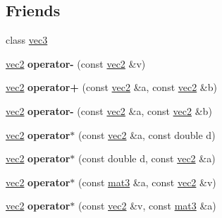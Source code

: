 \subsection*{Friends}
\begin{DoxyCompactItemize}
\item 
\hypertarget{classvec2_aa849243c6cd858bbcd88237a8ad16cad}{
class \hyperlink{classvec2_aa849243c6cd858bbcd88237a8ad16cad}{vec3}}
\label{classvec2_aa849243c6cd858bbcd88237a8ad16cad}

\item 
\hypertarget{classvec2_a4a372204e9d4fbce7b21ba855dc5e567}{
\hyperlink{classvec2}{vec2} {\bfseries operator-\/} (const \hyperlink{classvec2}{vec2} \&v)}
\label{classvec2_a4a372204e9d4fbce7b21ba855dc5e567}

\item 
\hypertarget{classvec2_af88e7bfe4941c172e739b2ed12dc3dbf}{
\hyperlink{classvec2}{vec2} {\bfseries operator+} (const \hyperlink{classvec2}{vec2} \&a, const \hyperlink{classvec2}{vec2} \&b)}
\label{classvec2_af88e7bfe4941c172e739b2ed12dc3dbf}

\item 
\hypertarget{classvec2_a38bfd1f3fcf7ccb830294f81494c31f5}{
\hyperlink{classvec2}{vec2} {\bfseries operator-\/} (const \hyperlink{classvec2}{vec2} \&a, const \hyperlink{classvec2}{vec2} \&b)}
\label{classvec2_a38bfd1f3fcf7ccb830294f81494c31f5}

\item 
\hypertarget{classvec2_a4404d88003d01ecf378ee1386ea88bf2}{
\hyperlink{classvec2}{vec2} {\bfseries operator$\ast$} (const \hyperlink{classvec2}{vec2} \&a, const double d)}
\label{classvec2_a4404d88003d01ecf378ee1386ea88bf2}

\item 
\hypertarget{classvec2_a764fea4d36a17fcf2926013e78ed5e43}{
\hyperlink{classvec2}{vec2} {\bfseries operator$\ast$} (const double d, const \hyperlink{classvec2}{vec2} \&a)}
\label{classvec2_a764fea4d36a17fcf2926013e78ed5e43}

\item 
\hypertarget{classvec2_a307ae299187b6d9e75b1a7730b6213c2}{
\hyperlink{classvec2}{vec2} {\bfseries operator$\ast$} (const \hyperlink{classmat3}{mat3} \&a, const \hyperlink{classvec2}{vec2} \&v)}
\label{classvec2_a307ae299187b6d9e75b1a7730b6213c2}

\item 
\hypertarget{classvec2_a291441f8875ed2cfe2ef1c6beadd87ca}{
\hyperlink{classvec2}{vec2} {\bfseries operator$\ast$} (const \hyperlink{classvec2}{vec2} \&v, const \hyperlink{classmat3}{mat3} \&a)}
\label{classvec2_a291441f8875ed2cfe2ef1c6beadd87ca}


\end{DoxyCompactItemize}
